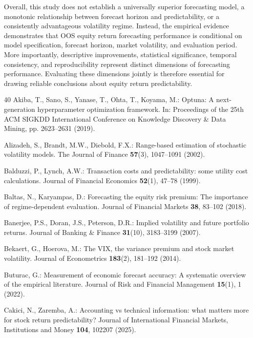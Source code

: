 \documentclass[runningheads,orivec]{llncs}
\begin{document}
Overall, this study does not establish a universally superior forecasting model, a monotonic relationship between forecast horizon and predictability, or a consistently advantageous volatility regime. Instead, the empirical evidence demonstrates that OOS equity return forecasting performance is conditional on model specification, forecast horizon, market volatility, and evaluation period. More importantly, descriptive improvements, statistical significance, temporal consistency, and reproducibility represent distinct dimensions of forecasting performance. Evaluating these dimensions jointly is therefore essential for drawing reliable conclusions about equity return predictability.


\begin{thebibliography}{40}
Akiba, T., Sano, S., Yanase, T., Ohta, T., Koyama, M.: Optuna: A next-generation hyperparameter optimization framework. In: Proceedings of the 25th ACM SIGKDD International Conference on Knowledge Discovery \& Data Mining, pp. 2623--2631 (2019).

Alizadeh, S., Brandt, M.W., Diebold, F.X.: Range-based estimation of stochastic volatility models. The Journal of Finance \textbf{57}(3), 1047--1091 (2002).

Balduzzi, P., Lynch, A.W.: Transaction costs and predictability: some utility cost calculations. Journal of Financial Economics \textbf{52}(1), 47--78 (1999).

Baltas, N., Karyampas, D.: Forecasting the equity risk premium: The importance of regime-dependent evaluation. Journal of Financial Markets \textbf{38}, 83--102 (2018).

Banerjee, P.S., Doran, J.S., Peterson, D.R.: Implied volatility and future portfolio returns. Journal of Banking \& Finance \textbf{31}(10), 3183--3199 (2007).

Bekaert, G., Hoerova, M.: The VIX, the variance premium and stock market volatility. Journal of Econometrics \textbf{183}(2), 181--192 (2014).

Buturac, G.: Measurement of economic forecast accuracy: A systematic overview of the empirical literature. Journal of Risk and Financial Management \textbf{15}(1), 1 (2022).

Cakici, N., Zaremba, A.: Accounting vs technical information: what matters more for stock return predictability? Journal of International Financial Markets, Institutions and Money \textbf{104}, 102207 (2025).


\end{thebibliography}
\end{document}
